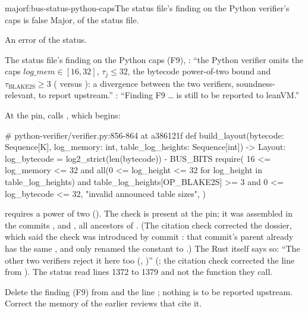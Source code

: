 \begin{finding}{major}{f:bus-status-python-caps}{The status file's finding on the Python verifier's caps is false}
 Major, of the status file.

 An error of the status.

 The status file's finding on the Python caps (F9), : ``the
Python verifier omits the caps $\mathit{log\_mem} ∈ [16, 32]$, $τ_j ≤ 32$, the bytecode
power-of-two bound and $τ_{\mathrm{BLAKE2S}} ≥ 3$ ( versus
): a divergence between the two verifiers, soundness-relevant, to report
upstream.'' : ``Finding F9 … is still to be reported to leanVM.''

At the pin,  calls , which begins:
\begin{srccode}
# python-verifier/verifier.py:856-864 at a386121f
def build_layout(bytecode: Sequence[K], log_memory: int, table_log_heights: Sequence[int]) -> Layout:
    log_bytecode = log2_strict(len(bytecode)) - BUS_BITS
    require(
        16 <= log_memory <= 32
        and all(0 <= log_height <= 32 for log_height in table_log_heights)
        and table_log_heights[OP_BLAKE2S] >= 3
        and 0 <= log_bytecode <= 32,
        "invalid announced table sizes",
    )
\end{srccode}

 requires a power of two (). The check is present at the pin;
it was assembled in the commits ,  and , all
ancestors of . (The citation check corrected the dossier, which said the check was
introduced by commit : that commit's parent already has the same ,
and  only renamed the constant  to .) The Rust
itself says so: ``The other two verifiers reject it here too (,
)'' (; the citation check corrected the line from
). The status read lines 1372 to 1379 and not the function they call.

 Delete the finding (F9) from  and the line
; nothing is to be reported upstream. Correct the memory of the earlier reviews that
cite it.
\end{finding}

